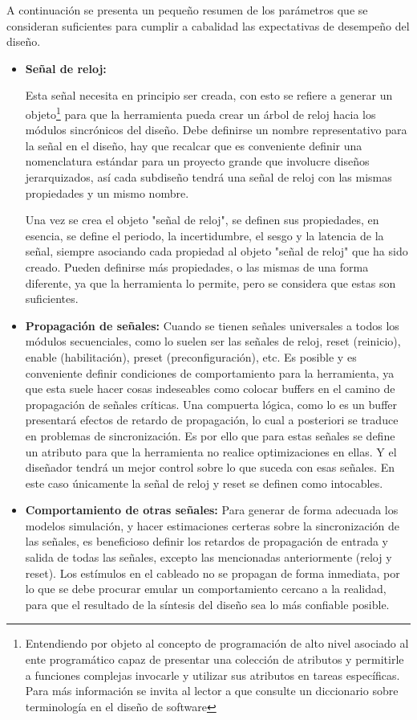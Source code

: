 A continuación se presenta un pequeño resumen de los parámetros que se consideran suficientes para cumplir a cabalidad las expectativas de desempeño del diseño.

\begin{itemize}
\item \textbf{Señal de reloj:} {Esta señal necesita en principio ser creada, con esto se refiere a generar un objeto\footnote{Entendiendo por objeto al concepto de programación de alto nivel asociado al ente programático capaz de presentar una colección de atributos y permitirle a funciones complejas invocarle y utilizar sus atributos en tareas específicas. Para más información se invita al lector a que consulte un diccionario sobre terminología en el diseño de software} para que la herramienta pueda crear un árbol de reloj hacia los módulos sincrónicos del diseño. Debe definirse un nombre representativo para la señal en el diseño, hay que recalcar que es conveniente definir una nomenclatura estándar para un proyecto grande que involucre diseños jerarquizados, así cada subdiseño tendrá una señal de reloj con las mismas propiedades y un mismo nombre.

Una vez se crea el objeto "señal de reloj", se definen sus propiedades, en esencia, se define el periodo, la incertidumbre, el sesgo y la latencia de la señal, siempre asociando cada propiedad al objeto "señal de reloj" que ha sido creado. Pueden definirse más propiedades, o las mismas de una forma diferente, ya que la herramienta lo permite, pero se considera que estas son suficientes.}

\item \textbf{Propagación de señales:} {Cuando se tienen señales universales a todos los módulos secuenciales, como lo suelen ser las señales de reloj, reset (reinicio), enable (habilitación), preset (preconfiguración), etc. Es posible y es conveniente definir condiciones de comportamiento para la herramienta, ya que esta suele hacer cosas indeseables como colocar buffers en el camino de propagación de señales críticas. Una compuerta lógica, como lo es un buffer presentará efectos de retardo de propagación, lo cual a posteriori se traduce en problemas de sincronización. Es por ello que para estas señales se define un atributo para que la herramienta no realice optimizaciones en ellas. Y el diseñador tendrá un mejor control sobre lo que suceda con esas señales. En este caso únicamente la señal de reloj y reset se definen como intocables.}

\item \textbf{Comportamiento de otras señales:} {Para generar de forma adecuada los modelos simulación, y hacer estimaciones certeras sobre la sincronización de las señales, es beneficioso definir los retardos de propagación de entrada y salida de todas las señales, excepto las mencionadas anteriormente (reloj y reset). Los estímulos en el cableado no se propagan de forma inmediata, por lo que se debe procurar emular un comportamiento cercano a la realidad, para que el resultado de la síntesis del diseño sea lo más confiable posible.}


\end{itemize}
